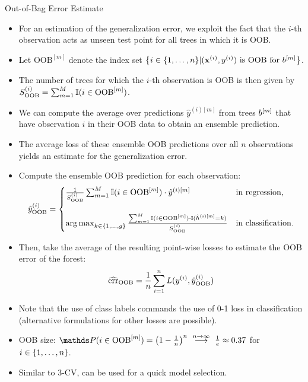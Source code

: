 \documentclass[11pt,compress,t,notes=noshow, xcolor=table]{beamer}
\begin{document}
\begin{vbframe}{Out-of-Bag Error Estimate}
\begin{itemize}
  \item For an estimation of the generalization error, we exploit the
  fact that the $i$-th observation acts as unseen test point for all trees in
  which it is OOB.
  \item Let $\text{OOB}^{[m]}$ denote the index set
  $\left \{i \in \{1, \ldots, n\} | (\mathbf{x}^{(i)}, y^{(i)}) \text{ is OOB for } b^{[m]} \right \}$.
  \item The number of trees for which the $i$-th observation is OOB is then
  given by $S_{\text{OOB}}^{(i)} =
  \sum_{m = 1}^M \mathbb{I}(i \in \text{OOB}^{[m]})$.
  \item We can compute the average over predictions $\hat{y}^{(i)[m]}$ from
  trees $b^{[m]}$ that have observation $i$ in their OOB data to obtain an
  ensemble prediction.
  \item The average loss of these ensemble OOB predictions over all $n$
  observations yields an estimate for the generalization error.
  \item Compute the ensemble OOB prediction for each observation:
  $$\hat{y}^{(i)}_{\text{OOB}} = \begin{cases}
  \frac{1}{S_{\text{OOB}}^{(i)}} \sum_{m = 1}^{M}
  \mathbb{I}(i \in \text{OOB}^{[m]}) \cdot \hat{y}^{(i)[m]} & \text{in regression,}
  \\ \phantom{x} \\
  \operatorname{arg\,max}_{k \in \{1, \ldots, g\}}
  \frac{\sum_{m = 1}^{M} \mathbb{I}(i \in \text{OOB}^{[m]}) \cdot
  \mathbb{I}(\hat{h}^{(i)[m]} = k)} {S_{\text{OOB}}^{(i)}} &
  \text{in classification.}
  \end{cases}$$
  \item Then, take the average of the resulting point-wise losses to estimate
  the OOB error of the forest:
  $$\widehat{\text{err}}_{\text{OOB}} = \frac{1}{n} \sum\limits_{i=1}^n L(y^{(i)}, \hat{y}^{(i)}_{\text{OOB}})$$
  \item Note that the use of class labels commands the use of 0-1 loss in
  classification (alternative formulations for other losses are possible).
  \item OOB size: $\P(i \in \text{OOB}^{[m]}) = \left(1 - \frac{1}{n}\right)^n
  \ \stackrel{n \to \infty}{\longrightarrow} \ \frac{1}{e} \approx 0.37$ for
  $i \in \{1, \ldots, n\}$.
  \item Similar to 3-CV, can be used for a quick model selection.
\end{itemize}


\end{vbframe}

\endlecture
\end{document}
